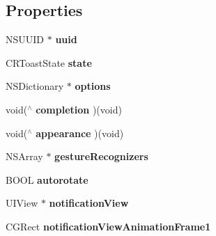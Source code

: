 \subsection*{Properties}
\begin{DoxyCompactItemize}
\item 
\hypertarget{interface_c_r_toast_ab6ba672eb0caa6eb6f7263dddd843b9a}{}N\+S\+U\+U\+I\+D $\ast$ {\bfseries uuid}\label{interface_c_r_toast_ab6ba672eb0caa6eb6f7263dddd843b9a}

\item 
\hypertarget{interface_c_r_toast_a7de4af122c0da4c71612367e3eef813b}{}C\+R\+Toast\+State {\bfseries state}\label{interface_c_r_toast_a7de4af122c0da4c71612367e3eef813b}

\item 
\hypertarget{interface_c_r_toast_ae79d60d5615d3ced914b29f92faea43a}{}N\+S\+Dictionary $\ast$ {\bfseries options}\label{interface_c_r_toast_ae79d60d5615d3ced914b29f92faea43a}

\item 
\hypertarget{interface_c_r_toast_a5a1e0a70ab0c455bf53527bde98c5e7e}{}void($^\wedge$ {\bfseries completion} )(void)\label{interface_c_r_toast_a5a1e0a70ab0c455bf53527bde98c5e7e}

\item 
\hypertarget{interface_c_r_toast_ab84cc2dc78f5d62ea9b8b4690ca7b89b}{}void($^\wedge$ {\bfseries appearance} )(void)\label{interface_c_r_toast_ab84cc2dc78f5d62ea9b8b4690ca7b89b}

\item 
\hypertarget{interface_c_r_toast_a20af4c4e80f89dab2ffb2dc015e35d8d}{}N\+S\+Array $\ast$ {\bfseries gesture\+Recognizers}\label{interface_c_r_toast_a20af4c4e80f89dab2ffb2dc015e35d8d}

\item 
\hypertarget{interface_c_r_toast_af6fe0a88c4faf728a306e1792e087972}{}B\+O\+O\+L {\bfseries autorotate}\label{interface_c_r_toast_af6fe0a88c4faf728a306e1792e087972}

\item 
\hypertarget{interface_c_r_toast_a1d860915871804e43ebf6fd11ada0f0d}{}U\+I\+View $\ast$ {\bfseries notification\+View}\label{interface_c_r_toast_a1d860915871804e43ebf6fd11ada0f0d}

\item 
\hypertarget{interface_c_r_toast_a24a04423291364da1dc531fb2f9983d1}{}C\+G\+Rect {\bfseries notification\+View\+Animation\+Frame1}\label{interface_c_r_toast_a24a04423291364da1dc531fb2f9983d1}


\end{DoxyCompactItemize}
